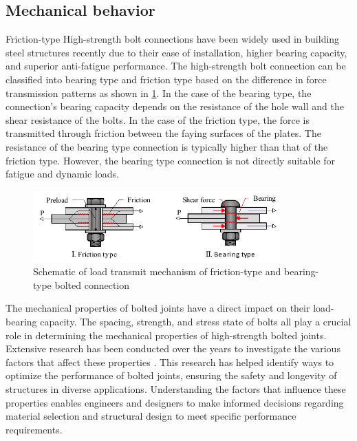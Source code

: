 \subsection{Mechanical behavior}

Friction-type High-strength bolt connections have been widely used in building steel structures recently due to their ease of installation, higher bearing capacity, and superior anti-fatigue performance. The high-strength bolt connection can be classified into bearing type and friction type based on the difference in force transmission patterns as shown in \ref{fig-fricandbearing}. In the case of the bearing type, the connection's bearing capacity depends on the resistance of the hole wall and the shear resistance of the bolts. In the case of the friction type, the force is transmitted through friction between the faying surfaces of the plates. The resistance of the bearing type connection is typically higher than that of the friction type. However, the bearing type connection is not directly suitable for fatigue and dynamic loads.

\begin{figure}[htbp]
    \centering
    \includegraphics[width=0.85\textwidth]{imgs/ch2/fricandbearing.pdf}
    \caption{Schematic of load transmit mechanism of friction-type and bearing-type bolted connection}
    \label{fig-fricandbearing}
\end{figure}

The mechanical properties of bolted joints have a direct impact on their load-bearing capacity. The spacing, strength, and stress state of bolts all play a crucial role in determining the mechanical properties of high-strength bolted joints. Extensive research has been conducted over the years to investigate the various factors that affect these properties \cite{peng2015,Lyu2019NumericalSteels,Brian1996EdgeOcnnections,wang2020interface,hirashima2004experimental}. This research has helped identify ways to optimize the performance of bolted joints, ensuring the safety and longevity of structures in diverse applications. Understanding the factors that influence these properties enables engineers and designers to make informed decisions regarding material selection and structural design to meet specific performance requirements.


